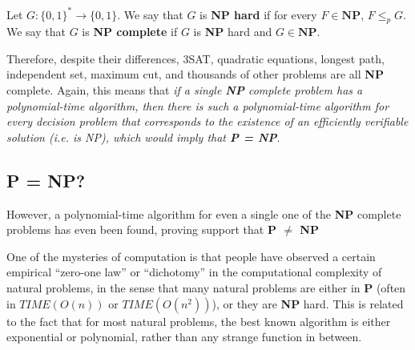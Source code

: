   \begin{definition}
  Let $G: \{0,1\}^* \longrightarrow \{0,1\}$. We say that $G$ is \textbf{NP hard} if for every $F \in \mathbf{NP}$, $F \leq_p G$. We say that $G$ is \textbf{NP complete} if $G$ is \textbf{NP} hard and $G \in \mathbf{NP}$. 
  \end{definition}

  Therefore, despite their differences, 3SAT, quadratic equations, longest path, independent set, maximum cut, and thousands of other problems are all \textbf{NP} complete. Again, this means that \textit{if a single \textbf{NP} complete problem has a polynomial-time algorithm, then there is such a polynomial-time algorithm for every decision problem that corresponds to the existence of an efficiently verifiable solution (i.e. is NP), which would imply that \textbf{P = NP}}.

\subsection{P = NP?}

  However, a polynomial-time algorithm for even a single one of the \textbf{NP} complete problems has even been found, proving support that \textbf{P $\neq$ NP}

  One of the mysteries of computation is that people have observed a certain empirical “zero-one law” or “dichotomy” in the computational complexity of natural problems, in the sense that many natural problems are either in \textbf{P} (often in $TIME(O(n))$ or $TIME(O(n^2))$), or they are \textbf{NP} hard. This is related to the fact that for most natural problems, the best known algorithm is either exponential or polynomial, rather than any strange function in between. 


